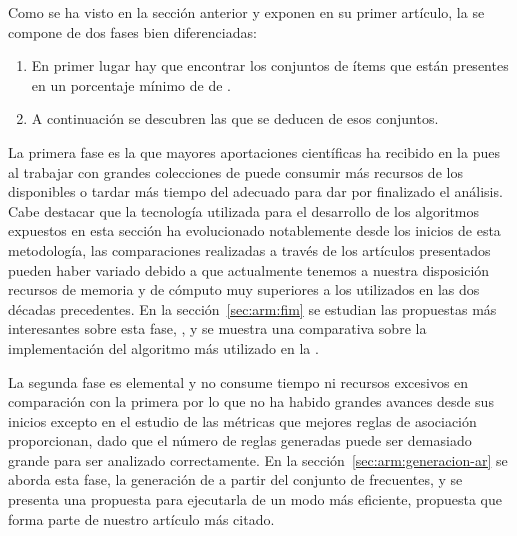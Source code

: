 
Como se ha visto en la sección anterior y exponen \citeauthor{AgrawalImielinskiSwami-MiningAssociationRulesBetweenSetsOfItemsInLargeDB-1993} en su primer artículo, la \ARM se compone de dos fases bien diferenciadas:
\begin{enumerate}
  \item En primer lugar hay que encontrar los conjuntos de ítems que están presentes en un porcentaje mínimo de \transacciones de \D.
  \item A continuación se descubren las \ARs que se deducen de esos conjuntos.
\end{enumerate}

La primera fase es la que mayores aportaciones científicas ha recibido en la \ARM pues al trabajar con grandes colecciones de \transacciones puede consumir más recursos de los disponibles o tardar más tiempo del adecuado para dar por finalizado el análisis. Cabe destacar que la tecnología utilizada para el desarrollo de los algoritmos expuestos en esta sección ha evolucionado notablemente desde los inicios de esta metodología, las comparaciones realizadas a través de los artículos presentados pueden haber variado debido a que actualmente tenemos a nuestra disposición recursos de memoria y de cómputo muy superiores a los utilizados en las dos décadas precedentes. En la sección~\ref{sec:arm:fim} se estudian las propuestas más interesantes sobre esta fase, \fim, y se muestra una comparativa sobre la implementación del algoritmo más utilizado en la \arm.

La segunda fase es elemental y no consume tiempo ni recursos excesivos en comparación con la primera por lo que no ha habido grandes avances desde sus inicios excepto en el estudio de las métricas que mejores reglas de asociación proporcionan, dado que el número de reglas generadas puede ser demasiado grande para ser analizado correctamente. En la sección~\ref{sec:arm:generacion-ar} se aborda esta fase, la generación de \ars a partir del conjunto de \itemsets frecuentes, y se presenta una propuesta para ejecutarla de un modo más eficiente, propuesta que forma parte de nuestro artículo más citado.
